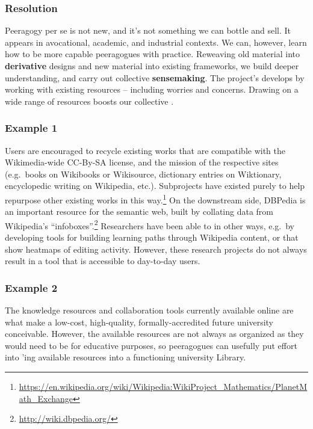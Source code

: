 
\subsubsection*{Resolution}  Peeragogy per se is not new, and it's not something we can bottle and sell.  It appears in avocational, academic, and industrial contexts.  We can, however, learn how to be more capable peeragogues with practice.  Reweaving old material into \textbf{derivative} designs and new material into existing frameworks, we build deeper understanding, and carry out collective \textbf{sensemaking}.
%
The project's  develops by working with existing resources -- including worries and concerns.
Drawing on a wide range of resources boosts our collective .

\subsubsection*{Example 1}
Users are encouraged to recycle existing works that are compatible
with the Wikimedia-wide CC-By-SA license, and the mission of the
respective sites (e.g.~books on Wikibooks or Wikisource, dictionary
entries on Wiktionary, encyclopedic writing on Wikipedia, etc.).  Subprojects have existed purely to help repurpose other existing works in this
way.\footnote{\url{https://en.wikipedia.org/wiki/Wikipedia:WikiProject_Mathematics/PlanetMath_Exchange}}  On the downstream side, DBPedia is an important resource for the
semantic web, built by collating data from Wikipedia's
``infoboxes''.\footnote{\url{http://wiki.dbpedia.org/}} Researchers
have been able to  in other ways,
e.g.~by developing tools for building learning paths through Wikipedia
content, or that show heatmaps of editing activity.  However, these
research projects do not always result in a tool that is accessible to
day-to-day users.

\vspace{.05cm}

\subsubsection*{Example 2}
The knowledge resources and collaboration tools currently available online
are what make a low-cost, high-quality, formally-accredited future university
conceivable.  However, the available resources are not always as
organized as they would need to be for educative purposes, so peeragogues can usefully put
effort into 'ing available
resources into a functioning university Library.

